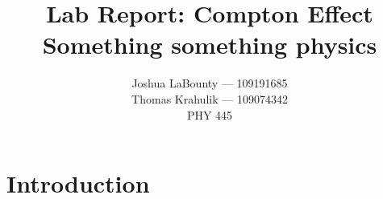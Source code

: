 \documentclass[12pt]{article}
\title{\textbf{Lab Report: Compton Effect} \\ Something something physics}
\author{Joshua LaBounty --- 109191685 \\ Thomas Krahulik --- 109074342 \\ \smallbreak PHY 445}
\begin{document}
\maketitle

\pagebreak

\tableofcontents 

\pagebreak

\section{Introduction}
\end{document}
